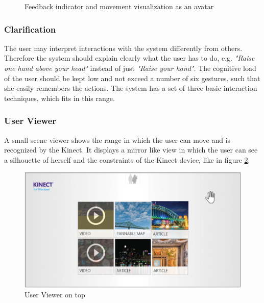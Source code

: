 \begin{figure}[htb]
\begin{minipage}[t]{0.49\linewidth}
		\label{fig:visualFeedbackAvatar}
	\end{minipage}
	\caption{Feedback indicator and movement visualization as an avatar~\cite{MicrosoftHIG2014-mh}}
	\label{fig:hciGuidelinesIndicatorAvatar}
\end{figure}

\subsubsection{Clarification}
The user may interpret interactions with the system differently from others. Therefore the system should explain clearly what the user has to do, e.g. \textit{"Raise one hand above your head"} instead of just \textit{"Raise your hand"}. The cognitive load of the user should be kept low and not exceed a number of six gestures, such that she easily remembers the actions. The system has a set of three basic interaction techniques, which fits in this range.

\subsubsection{User Viewer}
A small scene viewer shows the range in which the user can move and is recognized by the Kinect. It displays a mirror like view in which the user can see a silhouette of herself and the constraints of the Kinect device, like in figure \ref{fig:higUserViewer}.
\begin{figure}[htb]
	\centering
	\begin{minipage}[t]{1\linewidth}
		\centering
		\includegraphics[width=0.7\linewidth]{Pictures/higUserViewer}
		\caption{User Viewer on top~\cite{MicrosoftHIG2014-mh}}
		\label{fig:higUserViewer}
	\end{minipage}
\end{figure}

